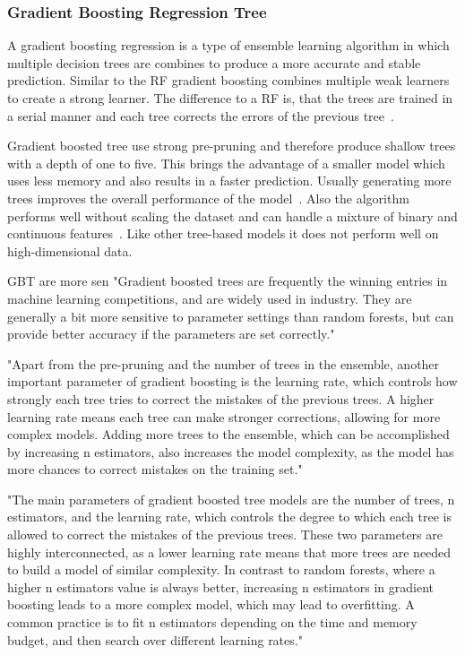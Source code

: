 \subsubsection{Gradient Boosting Regression Tree}
A gradient boosting regression is a type of ensemble learning algorithm in
which multiple decision trees are combines to produce a more accurate and stable
prediction.
Similar to the \ac{RF} gradient boosting combines multiple weak learners to create a
strong learner.
The difference to a \ac{RF} is, that the trees are trained in a serial manner and
each tree corrects the errors of the previous tree~\cite[p. 88--89]{
    muller_introductionmachinelearning_2016}.

Gradient boosted tree use strong pre-pruning and therefore produce shallow
trees with a depth of one to five.
This brings the advantage of a smaller model which uses less memory and also results in
a faster prediction.
Usually generating more trees improves the overall performance of the model~\cite[p.
88--89]{muller_introductionmachinelearning_2016}.
Also the algorithm performs well without scaling the dataset and can handle a mixture
of binary and continuous features~\cite[p. 88--89]{
    muller_introductionmachinelearning_2016}.
Like other tree-based models it does not perform well on high-dimensional data.

\ac{GBT} are more sen
"Gradient boosted trees are frequently the winning entries in machine
learning competitions, and are widely used in industry. They are
generally a bit more sensitive to parameter settings than random
forests, but can provide better accuracy if the parameters are set
correctly."~\cite[p. 88-89]{muller_introductionmachinelearning_2016}

"Apart from the pre-pruning and the number of trees in the ensemble,
another important parameter of gradient boosting is the learning rate,
which controls how strongly each tree tries to correct the mistakes of
the previous trees. A higher learning rate means each tree can make
stronger corrections, allowing for more complex models. Adding more trees to
the ensemble, which
can be accomplished
by increasing
n estimators, also increases the model complexity, as the model has
more chances to correct mistakes on the training set." \cite[p.
88-89]{muller_introductionmachinelearning_2016}

"The main parameters of gradient boosted tree models are the number
of trees, n estimators, and the learning rate, which controls the degree to
which each tree is
allowed to correct the
mistakes of the previous trees.
These two parameters are highly interconnected, as a lower
learning rate means that more trees are needed to build a model of
similar complexity. In contrast to random forests, where a higher
n estimators value is always better, increasing n estimators in gradient
boosting leads to a more complex model, which may lead to overfitting. A
common practice is to fit n estimators depending on the time and
memory budget, and then search over different learning rates." \cite[p.
88-89]{muller_introductionmachinelearning_2016}


